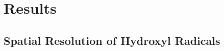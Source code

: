 \documentclass[11pt, oneside]{article}   	%
\begin{document}




\section{Results}

\subsection{Spatial Resolution of Hydroxyl Radicals} \label{subsec:SpatialRes}
\end{document}
